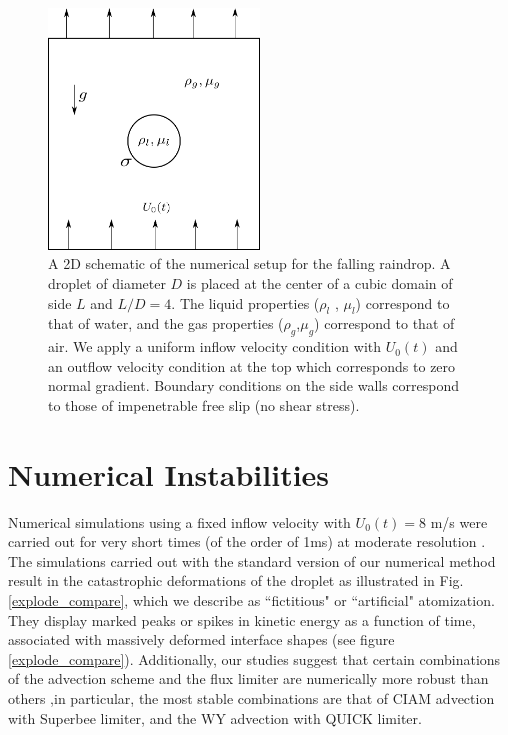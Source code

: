 \begin{figure}[h!]
\begin{center}
\includegraphics[width=0.5\textwidth]{plots/raindrop/setup.png}
\end{center}
\caption{A 2D schematic of the numerical setup for the falling raindrop. 
	A droplet of diameter $D$ is placed at the center of a cubic domain 
	of side $L$ and $L/D = 4$. The liquid properties ($\rho_l$ , $\mu_l$) 
	correspond to that of water, and the gas properties ($\rho_g$,$\mu_g$) 
	correspond to that of air. We apply a uniform inflow velocity condition 
	with $U_0(t)$ and an outflow velocity condition at the top which 
	corresponds to zero normal gradient.
	Boundary conditions on the side walls correspond 
	to those of impenetrable free slip (no shear stress).}
\label{setup}
\end{figure}

\section{Numerical Instabilities}

Numerical simulations using a fixed inflow velocity with $U_0(t) = 8 $ m/s 
were carried out for very short times (of the order of 1ms) at moderate resolution 
.
The simulations carried out with the standard version of our numerical method 
result in the catastrophic deformations of the droplet as illustrated in Fig. \ref{explode_compare}, 
which we describe as ``fictitious" or ``artificial" atomization. 
They display marked peaks or spikes in kinetic energy as a function of time, 
associated with massively deformed interface shapes (see figure \ref{explode_compare}). 
Additionally, our studies suggest that certain combinations 
of the advection scheme and the flux limiter are 
numerically more robust than others
,in particular, the most stable combinations 
are that of CIAM advection with 
Superbee limiter, and the WY advection with QUICK limiter. 

